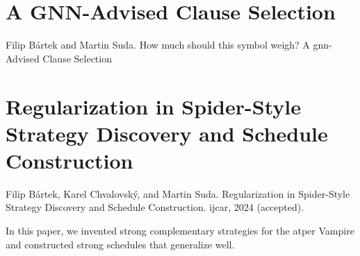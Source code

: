 

\section{A GNN-Advised Clause Selection}
\label{sec:results:selection}

Filip Bártek and Martin Suda. How much should this symbol weigh? A \acrshort{gnn}-Advised Clause Selection \cite{DBLP:conf/lpar/Bartek023}



\section{Regularization in Spider-Style Strategy Discovery and Schedule Construction}
\label{sec:results:regularization}

Filip Bártek, Karel Chvalovský, and Martin Suda. Regularization in Spider-Style Strategy Discovery and Schedule Construction. \Gls{ijcar}, 2024 (accepted). \cite{bartek2024regularization}

In this paper, we invented strong complementary strategies for the \gls{atper} Vampire and constructed strong schedules that generalize well.



